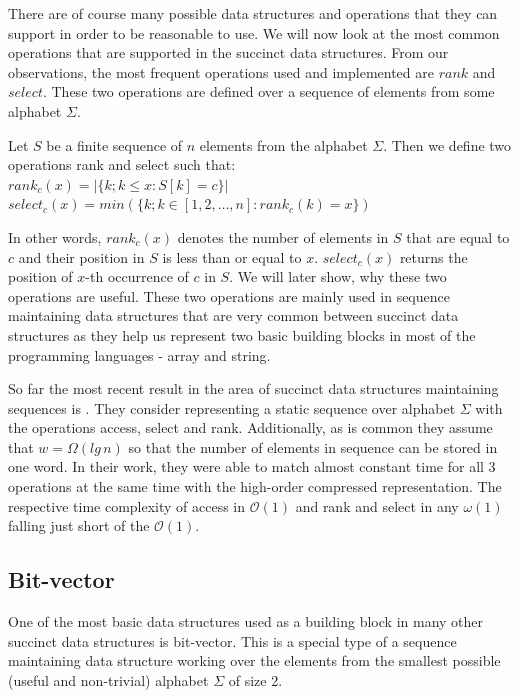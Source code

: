 There are of course many possible data structures and operations that they can support in order to be reasonable to use. We will now look at the most common operations that are supported in the succinct data structures. From our observations, the most frequent operations used and implemented are $rank$ and $select$. These two operations are defined over a sequence of elements from some alphabet $\Sigma$.

\begin{definition}
Let $S$ be a finite sequence of $n$ elements from the alphabet $\Sigma$.
Then we define two operations rank and select such that: \\
$rank_c(x) = | \{k; k\leq x: S[k] = c  \} |$ \\
$select_c(x) = min (\{k; k \in [ 1, 2, \ldots, n] : rank_c(k)=x  \}) $
\end{definition}

In other words, $rank_c(x)$ denotes the number of elements in $S$ that are equal to $c$ and their position in $S$ is less than or equal to $x$. $select_c(x)$ returns the position of $x$-th occurrence of $c$ in $S$. We will later show, why these two operations are useful. These two operations are mainly used in sequence maintaining data structures that are very common between succinct data structures as they help us represent two basic building blocks in most of the programming languages - array and string.

So far the most recent result in the area of succinct data structures maintaining sequences is \cite{belazzougui2015optimal}. They consider representing a static sequence over alphabet $\Sigma$ with the operations access, select and rank. Additionally, as is common they assume that $w=\Omega(lg\,n)$ so that the number of elements in sequence can be stored in one word. In their work, they were able to match almost constant time for all 3 operations at the same time with the high-order compressed representation. The respective time complexity of access in $\mathcal{O}(1)$ and rank and select in any $\omega(1)$ falling just short of the $\mathcal{O}(1)$.

\subsection{Bit-vector}

One of the most basic data structures used as a building block in many other succinct data structures is bit-vector. This is a special type of a sequence maintaining data structure working over the elements from the smallest possible (useful and non-trivial) alphabet $\Sigma$ of size 2.

